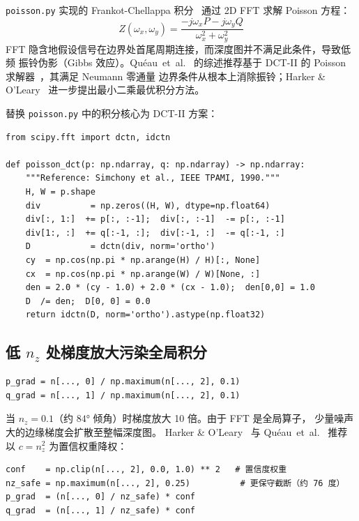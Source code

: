 \texttt{poisson.py} 实现的 Frankot-Chellappa 积分~\cite{frankot1988method}
通过 2D FFT 求解 Poisson 方程：
\[
  Z(\omega_x,\omega_y)
  = \frac{-j\omega_x P - j\omega_y Q}{\omega_x^2+\omega_y^2}
\]
FFT 隐含地假设信号在边界处首尾周期连接，而深度图并不满足此条件，导致低频
振铃伪影（Gibbs 效应）。Qu\'eau~et~al.~\cite{queeau2018normal} 的综述推荐基于
DCT-II 的 Poisson 求解器~\cite{simchony1990direct}，其满足 Neumann 零通量
边界条件从根本上消除振铃；Harker \& O'Leary~\cite{harker2008least}
进一步提出最小二乘最优积分方法。

\begin{fixbox}[frametitle={}]
替换 \texttt{poisson.py} 中的积分核心为 DCT-II 方案：

\begin{lstlisting}[caption={基于 DCT-II 的 Poisson 求解器（满足 Neumann BC）}]
from scipy.fft import dctn, idctn

def poisson_dct(p: np.ndarray, q: np.ndarray) -> np.ndarray:
    """Reference: Simchony et al., IEEE TPAMI, 1990."""
    H, W = p.shape
    div          = np.zeros((H, W), dtype=np.float64)
    div[:, 1:]  += p[:, :-1];  div[:, :-1]  -= p[:, :-1]
    div[1:, :]  += q[:-1, :];  div[:-1, :]  -= q[:-1, :]
    D            = dctn(div, norm='ortho')
    cy  = np.cos(np.pi * np.arange(H) / H)[:, None]
    cx  = np.cos(np.pi * np.arange(W) / W)[None, :]
    den = 2.0 * (cy - 1.0) + 2.0 * (cx - 1.0);  den[0,0] = 1.0
    D  /= den;  D[0, 0] = 0.0
    return idctn(D, norm='ortho').astype(np.float32)
\end{lstlisting}
\end{fixbox}

\subsection{低 \texorpdfstring{$n_z$}{nz} 处梯度放大污染全局积分}
\label{subsec:nz_amplification}

\begin{lstlisting}[caption={nz=0.1 时梯度被放大 10 倍（reconstruct.py）}]
p_grad = n[..., 0] / np.maximum(n[..., 2], 0.1)
q_grad = n[..., 1] / np.maximum(n[..., 2], 0.1)
\end{lstlisting}

当 $n_z = 0.1$（约 $84°$ 倾角）时梯度放大 10 倍。由于 FFT 是全局算子，
少量噪声大的边缘梯度会扩散至整幅深度图。
Harker \& O'Leary~\cite{harker2008least} 与
Qu\'eau~et~al.~\cite{queeau2018normal} 推荐以 $c = n_z^2$ 为置信权重降权：

\begin{fixbox}
\begin{lstlisting}
conf    = np.clip(n[..., 2], 0.0, 1.0) ** 2   # 置信度权重
nz_safe = np.maximum(n[..., 2], 0.25)          # 更保守截断（约 76 度）
p_grad  = (n[..., 0] / nz_safe) * conf
q_grad  = (n[..., 1] / nz_safe) * conf
\end{lstlisting}
\end{fixbox}

